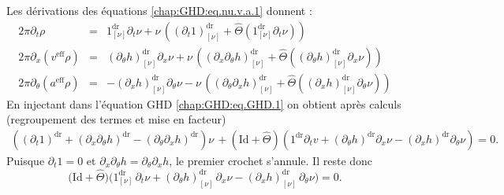 \medskip
Les dérivations des équations \eqref{chap:GHD:eq.nu.v.a.1} donnent :
\begin{eqnarray}
	2\pi \partial_t \rho & = & 1^{\mathrm{dr}}_{[\nu]} \partial_t \nu + \nu \, \left (  ( \partial_t 1 )^{\mathrm{dr}}_{[\nu]}  + \widehat{\Theta} \left ( 1^{\mathrm{dr}}_{[\nu]} \partial_t \nu   \right ) \right )  \\
	2\pi \partial_x ( v^{\mathrm{eff}} \rho ) & = & (\partial_\theta h )^{\mathrm{dr}}_{[\nu]} \partial_x \nu + \nu \, \left (  ( \partial_x \partial_\theta h )^{\mathrm{dr}}_{[\nu]}  +  \widehat{\Theta} \left ( (\partial_\theta h)^{\mathrm{dr}}_{[\nu]} \partial_x \nu   \right ) \right )\\
	2\pi \partial_\theta ( a^{\mathrm{eff}} \rho ) & = & -(\partial_x h )^{\mathrm{dr}}_{[\nu]} \partial_\theta \nu - \nu \, \left (  ( \partial_\theta \partial_x h )^{\mathrm{dr}}_{[\nu]}  +  \widehat{\Theta} \left ( (\partial_x h)^{\mathrm{dr}}_{[\nu]} \partial_\theta \nu   \right ) \right )
\end{eqnarray}
En injectant  dans l'équation \gls{GHD} \eqref{chap:GHD:eq.GHD.1} on obtient après calculs (regroupement des termes et mise en facteur)  
\begin{eqnarray}
	\left ( \left(\partial_t 1 \right)^{\mathrm{dr}}  + \left(\partial_x  \partial_\theta h  \right)^{\mathrm{dr}} - \left(\partial_\theta  \partial_x h  \right)^{\mathrm{dr}} \right ) \nu \, + ( \mathrm{Id} + \widehat{\Theta} )    \left ( 1^{\mathrm{dr}} \partial_t v +  \left ( \partial_\theta h \right )^{\mathrm{dr}} \partial_x \nu -  \left ( \partial_x h \right )^{\mathrm{dr}} \partial_\theta \nu\right ) = 0  . 
\end{eqnarray}
Puisque \(\partial_t1=0\) et \(\partial_x\partial_\theta h=\partial_\theta\partial_x h\), le premier crochet s'annule. Il reste donc
\[
\Big(\mathrm{Id} + \widehat{\Theta} \Big)\Big( 1^{\mathrm{dr}}_{[\nu]}\,\partial_t\nu
+ (\partial_\theta h)^{\mathrm{dr}}_{[\nu]}\,\partial_x\nu
- (\partial_x h)^{\mathrm{dr}}_{[\nu]}\,\partial_\theta\nu \Big) = 0.
\]


